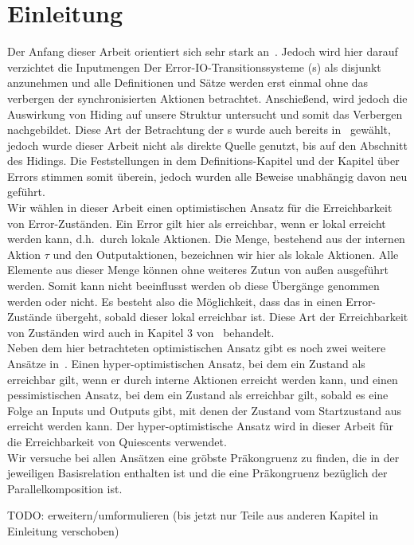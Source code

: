 \chapter{Einleitung}

Der Anfang dieser Arbeit orientiert sich sehr stark an~\cite{Vogler2014EIO}.
Jedoch wird hier darauf verzichtet die Inputmengen Der
Error-IO-Transitionssysteme (\EIO{}s) als disjunkt anzunehmen und alle
Definitionen und Sätze werden erst einmal ohne das verbergen der
synchronisierten Aktionen betrachtet. Anschießend, wird jedoch die Auswirkung
von Hiding auf unsere Struktur untersucht und somit das Verbergen nachgebildet.
Diese Art der Betrachtung der \EIO{}s wurde auch bereits
in~\cite{Schlosser2012BA} gewählt, jedoch wurde dieser Arbeit nicht als direkte
Quelle genutzt, bis auf den Abschnitt des Hidings. Die Feststellungen in dem
Definitions-Kapitel und der Kapitel über Errors stimmen somit überein, jedoch
wurden alle Beweise unabhängig davon neu geführt.\\
Wir wählen in dieser Arbeit einen optimistischen Ansatz für die
Erreichbarkeit von Error-Zuständen. Ein Error gilt hier als erreichbar, wenn er
lokal erreicht werden kann, d.h.\ durch lokale Aktionen. Die Menge, bestehend
aus der internen Aktion $\tau$ und den Outputaktionen, bezeichnen wir hier als
lokale Aktionen. Alle Elemente aus dieser Menge können ohne weiteres Zutun von
außen ausgeführt werden. Somit kann nicht beeinflusst werden ob diese Übergänge
genommen werden oder nicht. Es besteht also die Möglichkeit, dass das
\EIO{} in einen Error-Zustände übergeht, sobald dieser lokal erreichbar ist.
Diese Art der Erreichbarkeit von Zuständen wird auch in Kapitel 3
von~\cite{Vogler2014EIO} behandelt.\\
Neben dem hier betrachteten optimistischen Ansatz gibt es noch zwei weitere
Ansätze in~\cite{Vogler2014EIO}. Einen hyper-optimistischen Ansatz, bei dem ein
Zustand als erreichbar gilt, wenn er durch interne Aktionen erreicht werden
kann, und einen pessimistischen Ansatz, bei dem ein Zustand als erreichbar gilt,
sobald es eine Folge an Inputs und Outputs gibt, mit denen der Zustand vom
Startzustand aus erreicht werden kann. Der hyper-optimistische Ansatz wird in
dieser Arbeit für die Erreichbarkeit von Quiescents verwendet.\\
Wir versuche bei allen Ansätzen eine gröbste Präkongruenz zu finden, die in der
jeweiligen Basisrelation enthalten ist und die eine Präkongruenz bezüglich der
Parallelkomposition ist.

\scriptsize\textcolor{lgray}{TODO: erweitern/umformulieren (bis jetzt nur Teile aus anderen
Kapitel in Einleitung verschoben)}

\normalsize
